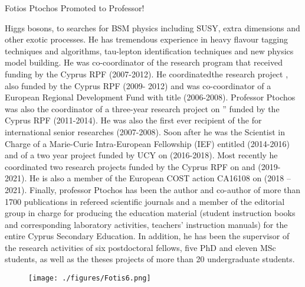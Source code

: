 \begin{headline}[enhanced, tikz={rotate=0}]{Fotios Ptochos Promoted to Professor!}
\begin{multicols}{2}
    Higgs bosons, to searches for BSM physics including SUSY, extra
    dimensions and other exotic processes. He has tremendous experience in
    heavy flavour tagging techniques and algorithms, tau-lepton
    identification techniques and new physics model building. 
    He was co-coordinator of the research program
     that
    received funding by the Cyprus RPF (2007-2012). He coordinatedthe
    research project , also funded by the Cyprus RPF (2009- 2012) and 
    was co-coordinator of a European Regional Development Fund with title  (2006-2008). Professor Ptochos was also the coordinator of a three-year
    research project on ”
    funded by the Cyprus RPF (2011-2014). He was also the first
    ever recipient of the 
    for international senior researches (2007-2008). Soon after he was
    the Scientist in Charge of a Marie-Curie Intra-European Fellowship
    (IEF) entitled 
    (2014-2016) and of a two year project funded by UCY on  (2016-2018). Most recently he coordinated
    two research projects funded by the Cyprus RPF on  and  (2019-2021). He
    is also a member of the European COST action CA16108 on  (2018 – 2021). 
    Finally, professor Ptochos has been the author and co-author of more than 
    1700 publications in refereed scientific journals and a member of the
    editorial group in charge for producing the education material
    (student instruction books and corresponding laboratory activities,
    teachers’ instruction manuals) for the entire Cyprus Secondary
    Education. In addition, he has been the supervisor of the research
    activities of six postdoctoral fellows, five PhD and eleven MSc
    students, as well as the theses projects of more than 20 undergraduate students.

    \begin{figure}
      \begin{center}
        \vspace{-0.2in}
        \leavevmode
        \texttt{[image: ./figures/Fotis6.png]}
      \end{center}
    \end{figure}
  \end{multicols}
\end{headline}
